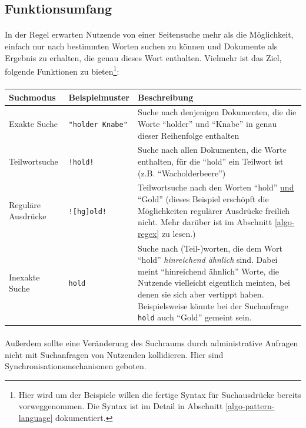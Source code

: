 \subsection{Funktionsumfang}
\label{anforderungen-features}

\paragraph{} In der Regel erwarten Nutzende von einer Seitensuche mehr als die Möglichkeit, einfach nur nach bestimmten Worten suchen zu können und Dokumente als Ergebnis zu erhalten, die genau dieses Wort enthalten. Vielmehr ist das Ziel, folgende Funktionen zu bieten\footnote{Hier wird um der Beispiele willen die fertige Syntax für Suchausdrücke bereits vorweggenommen. Die Syntax ist im Detail in Abschnitt \ref{algo-pattern-language} dokumentiert.}:

\paragraph{}

\begin{tabularx}{\textwidth}{llX}
\hline
\textbf{Suchmodus} & \textbf{Beispielmuster} & \textbf{Beschreibung} \\ [0.1cm]
\hline
Exakte Suche & \texttt{"holder Knabe"} & Suche nach denjenigen Dokumenten, die die Worte "`holder"' und "`Knabe"' in genau dieser Reihenfolge enthalten \\ [0.1cm]
\hline
Teilwortsuche & \texttt{!hold!} & Suche nach allen Dokumenten, die Worte enthalten, für die "`hold"' ein Teilwort ist (z.B. "`Wacholderbeere"') \\ [0.1cm]
\hline
Reguläre Ausdrücke & \texttt{![hg]old!} & Teilwortsuche nach den Worten "`hold"' \underline{und} "`Gold"' (dieses Beispiel erschöpft die Möglichkeiten regulärer Ausdrücke freilich nicht. Mehr darüber ist im Abschnitt \ref{algo-regex} zu lesen.)  \\ [0.1cm]
\hline
Inexakte Suche & \texttt{hold} & Suche nach (Teil-)worten, die dem Wort "`hold"' \textit{hinreichend ähnlich} sind. Dabei meint "`hinreichend ähnlich"' Worte, die Nutzende vielleicht eigentlich meinten, bei denen sie sich aber vertippt haben. Beispielsweise könnte bei der Suchanfrage \texttt{hold} auch "`Gold"' gemeint sein. \\ [0.1cm]
\hline
\end{tabularx}

\paragraph{} Außerdem sollte eine Veränderung des Suchraums durch administrative Anfragen nicht mit Suchanfragen von Nutzenden kollidieren. Hier sind Synchronisationsmechanismen geboten.

